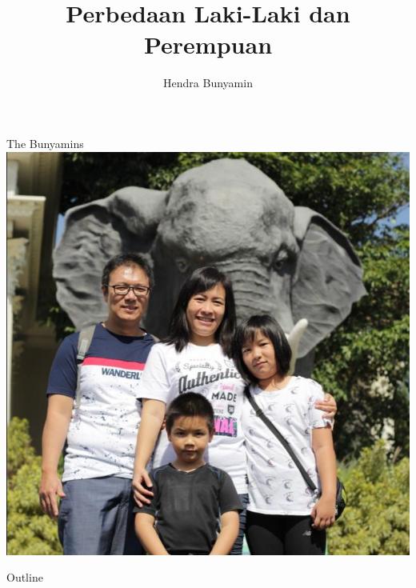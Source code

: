 \documentclass{beamer}
\title[Perbedaan Laki-Laki dan Perempuan] %
{\textbf{Perbedaan Laki-Laki dan Perempuan}}
\author[Hendra Bunyamin] %
{Hendra Bunyamin}
\institute[ ] %
{
  \hfill \break
  \hfill \break
  \hfill \break
  \large
  Bimbingan Pranikah\\
  GKI Anugerah
}
\theoremstyle{mystyle}
\begin{document}
\begin{frame}
  \titlepage
\end{frame}

\begin{frame}{The Bunyamins}
	\centering
	\includegraphics[scale=.35]{family}
\end{frame}

\begin{frame}{Outline}
  \tableofcontents
\end{frame}




\end{document}
